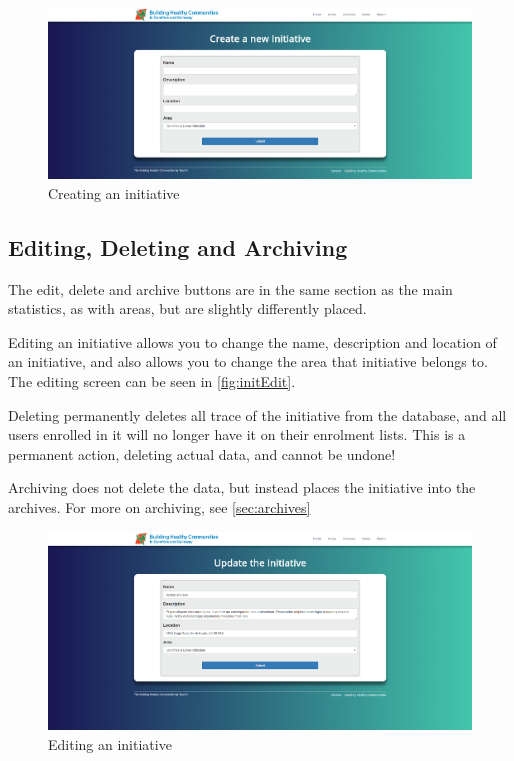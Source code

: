 \documentclass{bhcguides}
\begin{document}
\begin{figure}[h!]
 \centerline{\includegraphics[width=\textwidth, height=\textheight, keepaspectratio]{createinitiative.png}}
 \caption{Creating an initiative}
 \label{fig:createInit}
\end{figure}

\subsection{Editing, Deleting and Archiving}
\label{ssec:initeditdelete}

The edit, delete and archive buttons are in the same section as the main statistics, as with areas, but are slightly differently placed.

Editing an initiative allows you to change the name, description and location of an initiative, and also allows you to change the area that initiative belongs to. The editing screen can be seen in \autoref{fig:initEdit}.

Deleting permanently deletes all trace of the initiative from the database, and all users enrolled in it will no longer have it on their enrolment lists. This is a permanent action, deleting actual data, and cannot be undone!

Archiving does not delete the data, but instead places the initiative into the archives. For more on archiving, see \autoref{sec:archives}

\begin{figure}[h!]
 \centerline{\includegraphics[width=\textwidth, height=\textheight, keepaspectratio]{editinitiative.png}}
 \caption{Editing an initiative}
 \label{fig:initEdit}
\end{figure}
\end{document}
